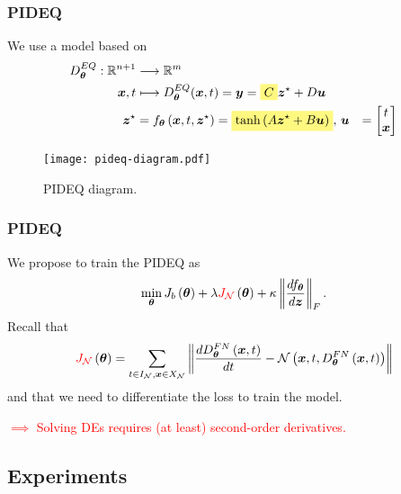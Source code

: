 \documentclass[t]{beamer}
\newcommand{\R}{\mathbb{R}}
\newcommand{\highlight}[1]{%
  \colorbox{yellow!50}{$\displaystyle#1$}}
\begin{document}
\begin{frame}
    \frametitle{PIDEQ}
    We use a model based on \cite{Ghaoui2019}
    \begin{align*}
	D^{EQ}_{\bm{\theta}}: \R^{n+1} &\longrightarrow \R^{m} \\
	\bm{x},t &\longmapsto 	D^{EQ}_{\bm{\theta}}(\bm{x},t) = \bm{y} = \highlight{C} \bm{z}^{\star} + D\bm{u} \\
	\bm{z}^{\star} &= f_{\bm{\theta}}\left( \bm{x},t, \bm{z}^{\star} \right)= \highlight{\tanh \left( A\bm{z}^\star + B\bm{u} \right)},\, \bm{u} &= \begin{bmatrix} t \\ \bm{x} \end{bmatrix}
    \end{align*}
    \begin{figure}[h]
        \centering
        \texttt{[image: pideq-diagram.pdf]}
        \caption{PIDEQ diagram.}
        \label{fig:pideq-diagram}
    \end{figure}
\end{frame}

\begin{frame}
    \frametitle{PIDEQ}
    \vfill
    We propose to train the PIDEQ as \[
	\min_{\bm{\theta}} J_b\left( \bm{\theta} \right) + \lambda \textcolor{red}{J_{\mathcal{N}}}\left( \bm{\theta} \right) + \kappa \left\lVert \frac{d f_{\bm{\theta}}}{d \bm{z}}\right\rVert_F
    .\] \pause
    Recall that \[
	\textcolor{red}{J_{\mathcal{N}}}\left( \bm{\theta} \right) = \sum_{t \in I_{\mathcal{N}},\bm{x}\in X_{\mathcal{N}}} \left\| \frac{d D^{FN}_{\bm{\theta}}\left( \bm{x}, t \right) }{dt} - \mathcal{N}\left( \bm{x}, t,D^{FN}_{\bm{\theta}}\left( \bm{x}, t \right)  \right)  \right\|
    \] and that we need to differentiate the loss to train the model.
    \pause

    \textcolor{red}{$\implies$ Solving DEs requires (at least) second-order derivatives.}
\end{frame}

\subsection{Experiments}
\end{document}
